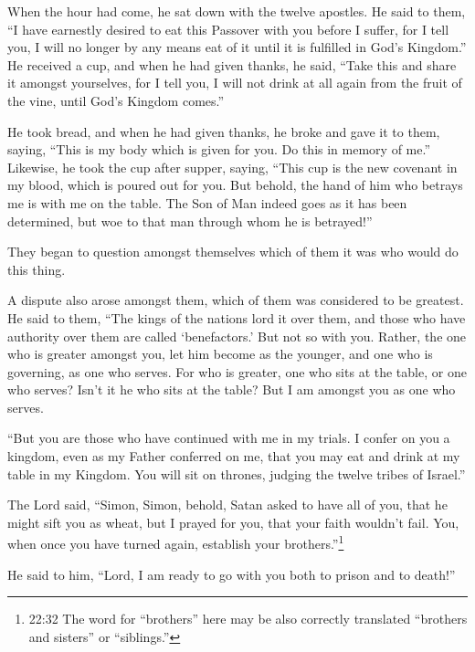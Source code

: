  When the hour had come, he sat down with the twelve
apostles.  He said to them, ``I have earnestly desired to
eat this Passover with you before I suffer,  for I tell
you, I will no longer by any means eat of it until it is fulfilled in
God's Kingdom.''  He received a cup, and when he had given
thanks, he said, ``Take this and share it amongst yourselves,
 for I tell you, I will not drink at all again from the
fruit of the vine, until God's Kingdom comes.''

 He took bread, and when he had given thanks, he broke and
gave it to them, saying, ``This is my body which is given for you. Do
this in memory of me.''  Likewise, he took the cup after
supper, saying, ``This cup is the new covenant in my blood, which is
poured out for you.  But behold, the hand of him who
betrays me is with me on the table.  The Son of Man indeed
goes as it has been determined, but woe to that man through whom he is
betrayed!''

 They began to question amongst themselves which of them it
was who would do this thing.

 A dispute also arose amongst them, which of them was
considered to be greatest.  He said to them, ``The kings of
the nations lord it over them, and those who have authority over them
are called `benefactors.'  But not so with you. Rather, the
one who is greater amongst you, let him become as the younger, and one
who is governing, as one who serves.  For who is greater,
one who sits at the table, or one who serves? Isn't it he who sits at
the table? But I am amongst you as one who serves.

 ``But you are those who have continued with me in my
trials.  I confer on you a kingdom, even as my Father
conferred on me,  that you may eat and drink at my table in
my Kingdom. You will sit on thrones, judging the twelve tribes of
Israel.''

 The Lord said, ``Simon, Simon, behold, Satan asked to have
all of you, that he might sift you as wheat,  but I prayed
for you, that your faith wouldn't fail. You, when once you have turned
again, establish your brothers.''\footnote{22:32 The word for
  ``brothers'' here may be also correctly translated ``brothers and
  sisters'' or ``siblings.''}

 He said to him, ``Lord, I am ready to go with you both to
prison and to death!''


